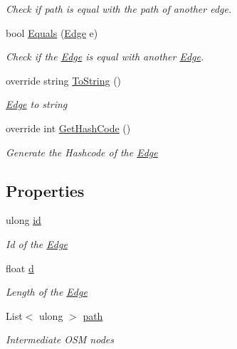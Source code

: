\begin{DoxyCompactItemize}
\begin{DoxyCompactList}\small\item\em Check if path is equal with the path of another edge. \end{DoxyCompactList}\item 
bool \hyperlink{classEdge_a4f8a452073ff0988962014e9037df65d}{Equals} (\hyperlink{classEdge}{Edge} e)
\begin{DoxyCompactList}\small\item\em Check if the \hyperlink{classEdge}{Edge} is equal with another \hyperlink{classEdge}{Edge}. \end{DoxyCompactList}\item 
override string \hyperlink{classEdge_a4ccf109be5219f74fdb635a73d93ab64}{To\+String} ()
\begin{DoxyCompactList}\small\item\em \hyperlink{classEdge}{Edge} to string \end{DoxyCompactList}\item 
override int \hyperlink{classEdge_a66fbde74247da2afd025b3ff48afaa92}{Get\+Hash\+Code} ()
\begin{DoxyCompactList}\small\item\em Generate the Hashcode of the \hyperlink{classEdge}{Edge} \end{DoxyCompactList}\end{DoxyCompactItemize}
\subsection*{Properties}
\begin{DoxyCompactItemize}
\item 
ulong \hyperlink{classEdge_ab6636388f33f71927f8b48f2444e2461}{id}
\begin{DoxyCompactList}\small\item\em Id of the \hyperlink{classEdge}{Edge}\end{DoxyCompactList}\item 
float \hyperlink{classEdge_ac641179c0f3b7387c98e1bd6386869df}{d}
\begin{DoxyCompactList}\small\item\em Length of the \hyperlink{classEdge}{Edge}\end{DoxyCompactList}\item 
List$<$ ulong $>$ \hyperlink{classEdge_a60f58b7cc5e9f00c8695fce3047933d8}{path}
\begin{DoxyCompactList}\small\item\em Intermediate O\+SM nodes\end{DoxyCompactList}\end{DoxyCompactItemize}


